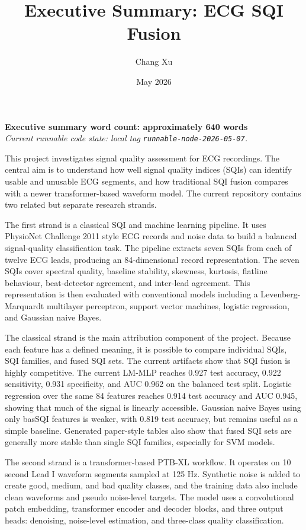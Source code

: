\documentclass[11pt,a4paper]{article}
\title{Executive Summary: ECG SQI Fusion}
\author{Chang Xu}
\date{May 2026}
\begin{document}
\maketitle

\begin{center}
\textbf{Executive summary word count: approximately 640 words}\\
\textit{Current runnable code state: local tag \texttt{runnable-node-2026-05-07}.}
\end{center}

This project investigates signal quality assessment for ECG recordings. The central aim is to understand how well signal quality indices (SQIs) can identify usable and unusable ECG segments, and how traditional SQI fusion compares with a newer transformer-based waveform model. The current repository contains two related but separate research strands.

The first strand is a classical SQI and machine learning pipeline. It uses PhysioNet Challenge 2011 style ECG records and noise data to build a balanced signal-quality classification task. The pipeline extracts seven SQIs from each of twelve ECG leads, producing an 84-dimensional record representation. The seven SQIs cover spectral quality, baseline stability, skewness, kurtosis, flatline behaviour, beat-detector agreement, and inter-lead agreement. This representation is then evaluated with conventional models including a Levenberg-Marquardt multilayer perceptron, support vector machines, logistic regression, and Gaussian naive Bayes.

The classical strand is the main attribution component of the project. Because each feature has a defined meaning, it is possible to compare individual SQIs, SQI families, and fused SQI sets. The current artifacts show that SQI fusion is highly competitive. The current LM-MLP reaches 0.927 test accuracy, 0.922 sensitivity, 0.931 specificity, and AUC 0.962 on the balanced test split. Logistic regression over the same 84 features reaches 0.914 test accuracy and AUC 0.945, showing that much of the signal is linearly accessible. Gaussian naive Bayes using only basSQI features is weaker, with 0.819 test accuracy, but remains useful as a simple baseline. Generated paper-style tables also show that fused SQI sets are generally more stable than single SQI families, especially for SVM models.

The second strand is a transformer-based PTB-XL workflow. It operates on 10 second Lead I waveform segments sampled at 125 Hz. Synthetic noise is added to create good, medium, and bad quality classes, and the training data also include clean waveforms and pseudo noise-level targets. The model uses a convolutional patch embedding, transformer encoder and decoder blocks, and three output heads: denoising, noise-level estimation, and three-class quality classification.
\end{document}
